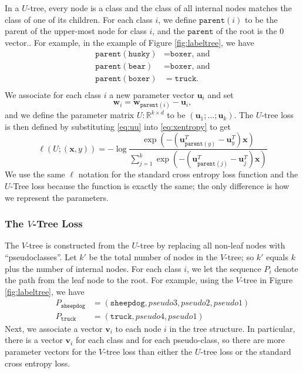 \documentclass[twoside]{article}
\newcommand{\parent}[1]{\texttt{parent}({#1})}
\newcommand{\trans}[1]{{#1}^{T}}
\newcommand{\vv}{\mathbf v}
\newcommand{\uu}{\mathbf u}
\newcommand{\w}{\mathbf w}
\newcommand{\x}{\mathbf x}
\begin{document}
In a $U$-tree, every node is a class and the class of all internal nodes matches the class of one of its children.
For each class $i$, we define $\parent{i}$ to be the parent of the upper-most node for class $i$,
and the $\texttt{parent}$ of the root is the 0 vector..
For example, in the example of Figure \ref{fig:labeltree},
we have
\begin{equation*}
\begin{split}
    \parent{\texttt{husky}} &= \texttt{boxer} \text{, and}\\
    \parent{\texttt{bear}} &= \texttt{boxer} \text{, and}\\
    \parent{\texttt{boxer}} &= \texttt{truck} .\\
\end{split}
\end{equation*}
We associate for each class $i$ a new parameter vector $\uu_i$ and set
\begin{equation}
    \w_i = \w_{\parent{i}} - \uu_i,
    \label{eq:uu}
\end{equation}
and we define the parameter matrix $U : \mathbb R^{k\times d}$ to be $(\uu_1;...;\uu_k)$.
The $U$-tree loss is then defined by substituting \eqref{eq:uu} into \eqref{eq:xentropy} to get
\begin{equation*}
    \ell(U;(\x,y)) = - \log \frac {\exp(-(\trans\uu_{\parent{y}}-\trans\uu_y) \x)}{\sum_{j=1}^k \exp(-(\trans\uu_{\parent{j}}-\trans \uu_j) \x)}
\end{equation*}
We use the same $\ell$ notation for the standard cross entropy loss function and the $U$-Tree loss because the function is exactly the same;
the only difference is how we represent the parameters.

\subsubsection{The $V$-Tree Loss}

The $V$-tree is constructed from the $U$-tree by replacing all non-leaf nodes with ``pseudoclasses''.
Let $k'$ be the total number of nodes in the $V$-tree;
so $k'$ equals $k$ plus the number of internal nodes.
For each class $i$, we let the sequence $P_i$ denote the path from the leaf node to the root.
For example, using the $V$-tree in Figure \ref{fig:labeltree},
we have
\begin{equation*}
\begin{split}
    P_{\texttt{sheepdog}} &= (\texttt{sheepdog}, \textit{pseudo3}, \textit{pseudo2}, \textit{pseudo1} ) \\
    P_{\texttt{truck}} &= (\texttt{truck}, \textit{pseudo4}, \textit{pseudo1} )
\end{split}
\end{equation*}
Next, we associate a vector $\vv_i$ to each node $i$ in the tree structure.
In particular, there is a vector $\vv_i$ for each class and for each pseudo-class,
so there are more parameter vectors for the $V$-tree loss than either the $U$-tree loss or the standard cross entropy loss.
\end{document}
